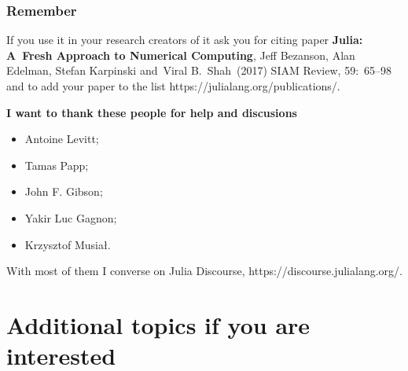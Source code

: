 \documentclass[10pt,t]{beamer}
\begin{document}
\begin{frame}
  \frametitle{Remember}


  \alert{If you use it in your research} creators of it ask you for
  citing paper \textbf{Julia: A~Fresh Approach to Numerical
    Computing}, Jeff Bezanson, Alan Edelman, Stefan Karpinski
  and~Viral B.~Shah~(2017) SIAM Review, 59:~65--98 and to add your
  paper to the list
  {https://julialang.org/publications/}.

  \vspace{1em}



  \textbf{I want to thank these people for help and discusions}
  \begin{itemize}
    \RaggedRight

  \item Antoine Levitt;

  \item Tamas Papp;

  \item John F. Gibson;

  \item Yakir Luc Gagnon;

  \item Krzysztof Musiał.

  \end{itemize}

  With most of them I converse on Julia Discourse,
  {https://discourse.julialang.org/}.

\end{frame}










\section{Additional topics if you are interested}





\appendix





\end{document}
